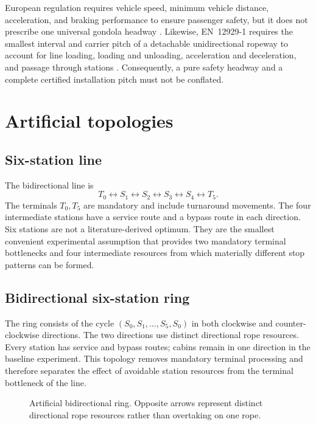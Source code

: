 \documentclass[11pt,a4paper]{scrartcl}
\begin{document}
European regulation requires vehicle speed, minimum vehicle distance,
acceleration, and braking performance to ensure passenger safety, but it does
not prescribe one universal gondola headway \cite{eu2016ropeways}.  Likewise,
EN~12929-1 requires the smallest interval and carrier pitch of a detachable
unidirectional ropeway to account for line loading, loading and unloading,
acceleration and deceleration, and passage through stations
\cite[Sec.~9.3]{en12929}.  Consequently, a pure safety headway and a complete
certified installation pitch must not be conflated.

\section{Artificial topologies}

\subsection{Six-station line}

The bidirectional line is
\[
T_0 \leftrightarrow S_1 \leftrightarrow S_2 \leftrightarrow
S_3 \leftrightarrow S_4 \leftrightarrow T_5.
\]
The terminals $T_0,T_5$ are mandatory and include turnaround movements.  The
four intermediate stations have a service route and a bypass route in each
direction.  Six stations are not a literature-derived optimum.  They are the
smallest convenient experimental assumption that provides two mandatory
terminal bottlenecks and four intermediate resources from which materially
different stop patterns can be formed.

\subsection{Bidirectional six-station ring}

The ring consists of the cycle $(S_0,S_1,\ldots,S_5,S_0)$ in both clockwise
and counter-clockwise directions.  The two directions use distinct directional
rope resources.  Every station has service and bypass routes; cabins remain in
one direction in the baseline experiment.  This topology removes mandatory
terminal processing and therefore separates the effect of avoidable station
resources from the terminal bottleneck of the line.

\begin{figure}[ht]
  \centering
  \caption{Artificial bidirectional ring.  Opposite arrows represent distinct
  directional rope resources rather than overtaking on one rope.}
\end{figure}
\end{document}
